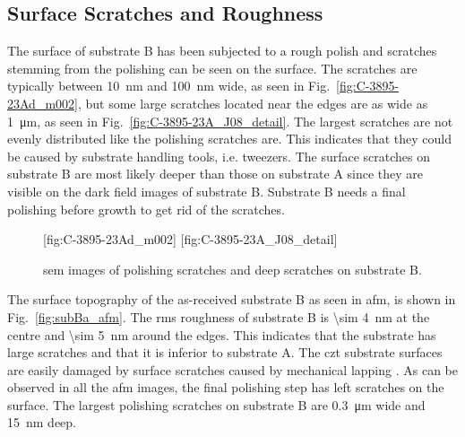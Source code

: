 \subsection{Surface Scratches and Roughness}
The surface of substrate B has been subjected to a rough polish and scratches stemming from the polishing can be seen on the surface. The scratches are typically between \SI{10}{\nano\metre} and \SI{100}{\nano\metre} wide, as seen in Fig.~\ref{fig:C-3895-23Ad_m002}, but some large scratches located near the edges are as wide as \SI{1}{\micro\metre}, as seen in Fig.~\ref{fig:C-3895-23A_J08_detail}. The largest scratches are not evenly distributed like the polishing scratches are. This indicates that they could be caused by substrate handling tools, i.e. tweezers. The surface scratches on substrate B are most likely deeper than those on substrate A since they are visible on the dark field images of substrate B. Substrate B needs a final polishing before growth to get rid of the scratches.
\begin{figure}[htbp]
    \centering
    [fig:C-3895-23Ad_m002]
    [fig:C-3895-23A_J08_detail]
    \caption[\Ac{sem} images of scratches on substrate B.]{\Ac{sem} images of  polishing scratches and  deep scratches on substrate B.}
    \label{fig:SEM_C389523_scratches}
\end{figure}

The surface topography of the as-received substrate B as seen in \ac{afm}, is shown in Fig.~\ref{fig:subBa_afm}. The \ac{rms} roughness of substrate B is \SI{\sim 4}{\nano\metre} at the centre and \SI{\sim 5}{\nano\metre} around the edges. This indicates that the substrate has large scratches and that it is inferior to substrate A. The \ac{czt} substrate surfaces are easily damaged by surface scratches caused by mechanical lapping \citep{egan2009scanning}. As can be observed in all the \ac{afm} images, the final polishing step has left scratches on the surface. The largest polishing scratches on substrate B are \SI{0.3}{\micro\metre} wide and \SI{15}{\nano\metre} deep.

